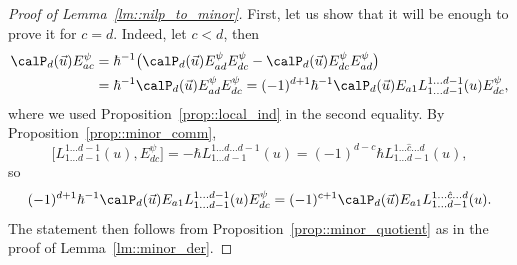 	\begin{proof}[Proof of Lemma~\ref{lm::nilp_to_minor}]
		First, let us show that it will be enough to prove it for $c=d$. Indeed, let $c<d$, then
		\begin{align*}
		\calP_d(\vec{u}) E_{ac}^{\psi} &= \hbar^{-1}\bigl(\calP_d(\vec{u}) E_{ad}^{\psi} E_{dc}^{\psi} - \calP_d(\vec{u}) 	E_{dc}^{\psi} E_{ad}^{\psi}\bigr) \\
		&	= \hbar^{-1} \calP_d(\vec{u}) E_{ad}^{\psi} E_{dc}^{\psi} = (-1)^{d+1} \hbar^{-1}\calP_d(\vec{u}) E_{a1} L_{1\dots d-1}^{1\dots d-1}(u) E_{dc}^{\psi},
		\end{align*}
		where we used Proposition~\ref{prop::local_ind} in the second equality. By Proposition~\ref{prop::minor_comm},
		\[
\bigl[L_{1\dots d-1}^{1\dots d-1}(u),E_{dc}^{\psi}\bigr] = - \hbar L_{1\dots d-1}^{1\dots d \dots d-1}(u) = (-1)^{d-c} \hbar L_{1\dots d-1}^{1\dots \hat{c} \dots d}(u),
\]
		so
		\[
		(-1)^{d+1} \hbar^{-1} \calP_d(\vec{u}) E_{a1} L_{1\dots d-1}^{1\dots d-1}(u) E_{dc}^{\psi} = (-1)^{c+1} \calP_d(\vec{u}) E_{a1} L_{1\dots d-1}^{1\dots \hat{c} \dots d}(u).
		\]
		The statement then follows from Proposition~\ref{prop::minor_quotient} as in the proof of Lemma~\ref{lm::minor_der}.
		

\end{proof}
